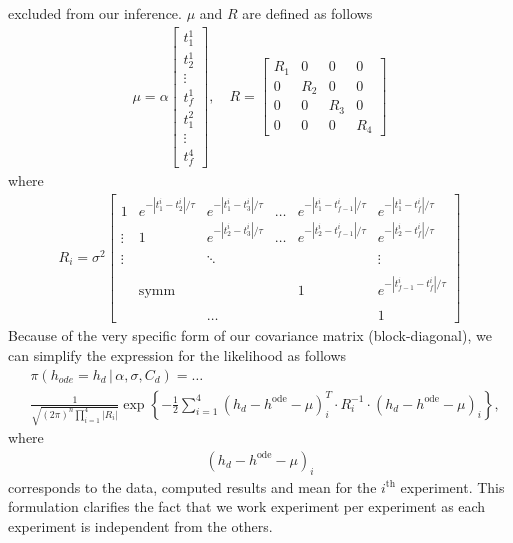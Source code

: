 \documentclass{article}
\begin{document}
excluded from our inference. $\mu$ and $R$ are defined as follows
\begin{align*}
\mu=\alpha\begin{bmatrix}t_{1}^{1}\\
t_{2}^{1}\\
\vdots\\
t_{f}^{1}\\
t_{1}^{2}\\
\vdots\\
t_{f}^{4}
\end{bmatrix},\quad R=\begin{bmatrix}R_{1} & 0 & 0 & 0\\
0 & R_{2} & 0 & 0\\
0 & 0 & R_{3} & 0\\
0 & 0 & 0 & R_{4}
\end{bmatrix}
\end{align*}
 where 
\begin{align*}
R_{i}=\sigma^{2}\begin{bmatrix}1 & e^{-|t_{1}^{i}-t_{2}^{i}|/\tau} & e^{-|t_{1}^{i}-t_{3}^{i}|/\tau} & \ldots & e^{-|t_{1}^{i}-t_{f-1}^{i}|/\tau} & e^{-|t_{1}^{1}-t_{f}^{i}|/\tau}\\
\vdots & 1 & e^{-|t_{2}^{i}-t_{3}^{i}|/\tau} & \ldots & e^{-|t_{2}^{i}-t_{f-1}^{i}|/\tau} & e^{-|t_{2}^{i}-t_{f}^{i}|/\tau}\\
\\
\vdots &  & \ddots &  &  & \vdots\\
\\
 & \text{symm} &  &  & 1 & e^{-|t_{f-1}^{i}-t_{f}^{i}|/\tau}\\
\\
 &  & \ldots &  &  & 1
\end{bmatrix}
\end{align*}
 Because of the very specific form of our covariance matrix (block-diagonal),
we can simplify the expression for the likelihood as follows 
\begin{align*}
 & \pi(h_{ode}=h_{d}\,|\,\alpha,\sigma,C_{d})=\ldots\\
 & \frac{1}{\sqrt{(2\pi)^{n}\prod_{i=1}^{4}|R_{i}|}}\exp\left\{ -\frac{1}{2}\sum_{i=1}^{4}\left(h_{d}-h^{\text{ode}}-\mu\right)_{i}^{T}\cdotp R_{i}^{-1}\cdotp\left(h_{d}-h^{\text{ode}}-\mu\right)_{i}\right\} ,
\end{align*}
 where 
\begin{align*}
\left(h_{d}-h^{\text{ode}}-\mu\right)_{i}
\end{align*}
 corresponds to the data, computed results and mean for the $i^{\text{th}}$
experiment. This formulation clarifies the fact that we work experiment
per experiment as each experiment is independent from the others.
\end{document}

